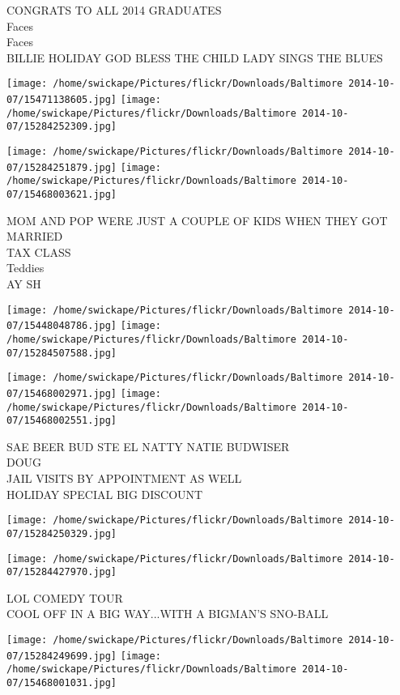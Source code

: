 \documentclass[10pt,letterpaper]{article}
\begin{document}
CONGRATS TO ALL 2014 GRADUATES\\
Faces\\
Faces\\
BILLIE HOLIDAY GOD BLESS THE CHILD LADY SINGS THE BLUES
\pagebreak

\texttt{[image: /home/swickape/Pictures/flickr/Downloads/Baltimore 2014-10-07/15471138605.jpg]}
\texttt{[image: /home/swickape/Pictures/flickr/Downloads/Baltimore 2014-10-07/15284252309.jpg]}

\texttt{[image: /home/swickape/Pictures/flickr/Downloads/Baltimore 2014-10-07/15284251879.jpg]}
\texttt{[image: /home/swickape/Pictures/flickr/Downloads/Baltimore 2014-10-07/15468003621.jpg]}

MOM AND POP WERE JUST A COUPLE OF KIDS WHEN THEY GOT MARRIED\\
TAX CLASS\\
Teddies\\
AY SH
\pagebreak

\texttt{[image: /home/swickape/Pictures/flickr/Downloads/Baltimore 2014-10-07/15448048786.jpg]}
\texttt{[image: /home/swickape/Pictures/flickr/Downloads/Baltimore 2014-10-07/15284507588.jpg]}

\texttt{[image: /home/swickape/Pictures/flickr/Downloads/Baltimore 2014-10-07/15468002971.jpg]}
\texttt{[image: /home/swickape/Pictures/flickr/Downloads/Baltimore 2014-10-07/15468002551.jpg]}

SAE BEER BUD STE EL NATTY NATIE BUDWISER\\
DOUG\\
JAIL VISITS BY APPOINTMENT AS WELL\\
HOLIDAY SPECIAL BIG DISCOUNT
\pagebreak

\texttt{[image: /home/swickape/Pictures/flickr/Downloads/Baltimore 2014-10-07/15284250329.jpg]}

\vspace{0.25in}
\texttt{[image: /home/swickape/Pictures/flickr/Downloads/Baltimore 2014-10-07/15284427970.jpg]}

LOL COMEDY TOUR\\
COOL OFF IN A BIG WAY...WITH A BIGMAN'S SNO{-}BALL
\pagebreak

\texttt{[image: /home/swickape/Pictures/flickr/Downloads/Baltimore 2014-10-07/15284249699.jpg]}
\texttt{[image: /home/swickape/Pictures/flickr/Downloads/Baltimore 2014-10-07/15468001031.jpg]}
\end{document}
